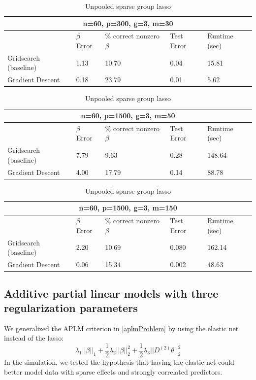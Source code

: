 \documentclass[10pt,letterpaper]{article}
\begin{document}
\begin{table}
\begin{center}
\begin{tabular}{| l | l | l | l | l | }
\hline
\multicolumn{5}{|c|}{n=60, p=300, g=3, m=30}\\
\hline
 & $\beta$ Error & \% correct nonzero $\beta$ & Test Error & Runtime (sec) \\
\hline
Gridsearch (baseline) & 1.13 & 10.70 & 0.04 & 15.81 \\
\hline
Gradient Descent & 0.18 & 23.79 & 0.01 & 5.62 \\
\hline
\end{tabular}

\begin{tabular}{| l | l | l | l | l | }
\hline
\multicolumn{5}{|c|}{n=60, p=1500, g=3, m=50}\\
\hline
 & $\beta$ Error & \% correct nonzero $\beta$ & Test Error & Runtime (sec) \\
\hline
Gridsearch (baseline) & 7.79 & 9.63 & 0.28 & 148.64 \\
\hline
Gradient Descent & 4.00 & 17.79 & 0.14 & 88.78 \\
\hline
\end{tabular}

\begin{tabular}{| l | l | l | l | l | }
\hline
\multicolumn{5}{|c|}{n=60, p=1500, g=3, m=150}\\
\hline
 & $\beta$ Error & \% correct nonzero $\beta$ & Test Error & Runtime (sec) \\
\hline
Gridsearch (baseline) & 2.20 & 10.69 & 0.080 & 162.14 \\
\hline
Gradient Descent & 0.06 & 15.34 & 0.002 & 48.63 \\
\hline
\end{tabular}
\end{center}
\caption {Unpooled sparse group lasso}
\label{table:unpooled}
\end{table}

\subsection{Additive partial linear models with three regularization parameters}
We generalized the APLM criterion in \eqref{aplmProblem} by using the elastic net instead of the lasso:
\begin{equation}
\lambda_1 \lvert\lvert \beta \rvert \rvert_1
+ \frac{1}{2} \lambda_2 \lvert\lvert \beta \rvert \rvert_2^2
+ \frac{1}{2} \lambda_3 \lvert\lvert D^{(2)} \theta \rvert \rvert_2^2
\end{equation}
In the simulation, we tested the hypothesis that having the elastic net could better model data with sparse effects and strongly correlated predictors.
\end{document}
